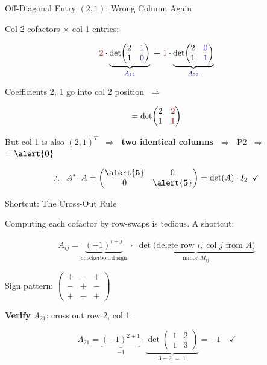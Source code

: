 \documentclass[10pt]{beamer}
\theoremstyle{definition}
\newcommand{\x}[1]{\alert{\textbf{#1}}}
\newcommand{\rd}[1]{{\color{red!70!black}#1}}
\newcommand{\bl}[1]{{\color{blue!70!black}#1}}
\begin{document}
\begin{frame}{Off-Diagonal Entry $(2,1)$: Wrong Column Again}

\bl{Col 2} cofactors $\times$ \rd{col 1} entries:

$$\rd{2}\cdot\underbrace{\det\!\begin{pmatrix}2&\bl{1}\\1&\bl{0}\end{pmatrix}}_{\bl{A_{12}}}
\;+\;
\rd{1}\cdot\underbrace{\det\!\begin{pmatrix}2&\bl{0}\\1&\bl{1}\end{pmatrix}}_{\bl{A_{22}}}$$

\vfill

Coefficients \rd{2}, \rd{1} go into \bl{col 2} position $\;\Longrightarrow\;$

$$= \det\!\begin{pmatrix}2&\rd{2}\\1&\rd{1}\end{pmatrix}$$

\vfill

But col 1 is also $(2,1)^T$ $\;\Longrightarrow\;$ \x{two identical columns} $\;\Longrightarrow\;$ P2 $\;\Longrightarrow\;$ $= \x{0}$

\vfill

$$\therefore\;\; A^*\!\cdot A = \begin{pmatrix}\x{5}&0\\0&\x{5}\end{pmatrix} = \det(A)\cdot I_2 \;\;\checkmark$$

\end{frame}


\begin{frame}{Shortcut: The Cross-Out Rule}

Computing each cofactor by row-swaps is tedious. A shortcut:

\vfill

$$\boxed{A_{ij} = \underbrace{(-1)^{i+j}}_{\text{checkerboard sign}} \;\cdot\; \underbrace{\det\!\big(\text{delete row }i,\;\text{col }j\text{ from }A\big)}_{\text{minor }M_{ij}}}$$

\vfill

Sign pattern:\quad
$\begin{pmatrix} + & - & + \\ - & + & - \\ + & - & + \end{pmatrix}$

\vfill

\textbf{Verify} $A_{21}$:\; cross out row 2, col 1:

$$A_{21} = \underbrace{(-1)^{2+1}}_{-1} \cdot \underbrace{\det\!\begin{pmatrix}1&2\\1&3\end{pmatrix}}_{3-2\;=\;1} = -1 \quad\checkmark$$

\end{frame}
\end{document}
